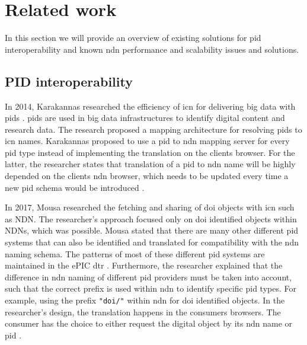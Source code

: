 \section{Related work}
\label{introduction-related-work}

In this section we will provide an overview of existing solutions for \gls{pid} interoperability and known \gls{ndn} performance and scalability issues and solutions.

\subsection{PID interoperability}
\label{introduction-pid}
In 2014, Karakannas researched the efficiency of \gls{icn} for delivering big data with \glspl{pid} \cite{icn-bd}. \glspl{pid} are used in big data infrastructures to identify digital content and research data. The research proposed a mapping architecture for resolving \glspl{pid} to \gls{icn} names. Karakannas proposed to use a \gls{pid} to \gls{ndn} mapping server for every \gls{pid} type instead of implementing the translation on the clients browser. For the latter, the researcher states that translation of a \gls{pid} to \gls{ndn} name will be highly depended on the clients \gls{ndn} browser, which needs to be updated every time a new \gls{pid} schema would be introduced \cite{icn-bd}.

In 2017, Mousa researched the fetching and sharing of \gls{doi} objects with \gls{icn} such as NDN. 
The researcher's approach focused only on \gls{doi} identified objects within NDNs, which was possible. Mousa stated that there are many other different \gls{pid} systems that can also be identified and translated for compatibility with the \gls{ndn} naming schema. The patterns of most of these different \gls{pid} systems are maintained in the ePIC \gls{dtr} \cite{dtr}.
 Furthermore, the researcher explained that the difference in \gls{ndn} naming of different \gls{pid} providers must be taken into account, such that the correct prefix is used within \gls{ndn} to identify specific \gls{pid} types. For example, using the prefix \texttt{"doi/"} within \gls{ndn} for \gls{doi} identified objects.
In the researcher's design, the translation happens in the consumers browsers. The consumer has the choice to either request the digital object by its \gls{ndn} name or \gls{pid} \cite{ndn-app-aware}.

